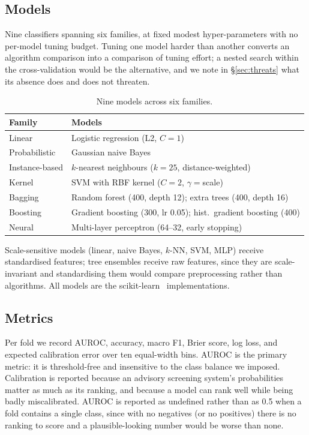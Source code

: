 \documentclass[11pt]{article}                      %
\newcommand{\tabfont}{\footnotesize}
\begin{document}
\subsection{Models}

Nine classifiers spanning six families, at fixed modest hyper-parameters with no
per-model tuning budget. Tuning one model harder than another converts an
algorithm comparison into a comparison of tuning effort; a nested search within
the cross-validation would be the alternative, and we note in
\S\ref{sec:threats} what its absence does and does not threaten.

\begin{table}[t]
\centering\tabfont
\caption{Nine models across six families.}
\label{tab:models}
\begin{tabular}{ll}
\toprule
Family & Models \\
\midrule
Linear & Logistic regression (L2, $C{=}1$) \\
Probabilistic & Gaussian naive Bayes \\
Instance-based & $k$-nearest neighbours ($k{=}25$, distance-weighted) \\
Kernel & SVM with RBF kernel ($C{=}2$, $\gamma{=}$scale) \\
Bagging & Random forest (400, depth 12); extra trees (400, depth 16) \\
Boosting & Gradient boosting (300, lr 0.05); hist.\ gradient boosting (400) \\
Neural & Multi-layer perceptron (64--32, early stopping) \\
\bottomrule
\end{tabular}
\end{table}

Scale-sensitive models (linear, naive Bayes, $k$-NN, SVM, MLP) receive
standardised features; tree ensembles receive raw features, since they are
scale-invariant and standardising them would compare preprocessing rather than
algorithms. All models are the scikit-learn~\cite{pedregosa2011scikit}
implementations.

\subsection{Metrics}

Per fold we record AUROC, accuracy, macro F1, Brier score, log loss, and expected
calibration error over ten equal-width bins. AUROC is the primary metric: it is
threshold-free and insensitive to the class balance we imposed. Calibration is
reported because an advisory screening system's probabilities matter as much as
its ranking, and because a model can rank well while being badly miscalibrated.
AUROC is reported as undefined rather than as 0.5 when a fold contains a single
class, since with no negatives (or no positives) there is no ranking to score and
a plausible-looking number would be worse than none.
\end{document}
